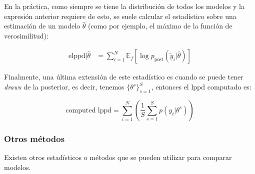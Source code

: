 En la práctica, como siempre se tiene la distribución de todos los modelos y la expresión anterior requiere de esto, se suele calcular el estadístico sobre una estimación de un modelo $\hat{\theta}$ (como por ejemplo, el máximo de la función de verosimilitud):

\begin{align}
\text{elppd}|\hat{\theta} & = \sum_{i=1}^N \mathbb{E}_f[\log p_{\text{post}}(\tilde{y}_i|\hat{\theta})]
\end{align}

Finalmente, una última extensión de este estadístico es cuando se puede tener \emph{draws} de la posterior, es decir, tenemos $\{ \theta^s\}_{s=1}^S$, entonces el lppd computado es:

\begin{equation}
\text{computed lppd} = \sum_{i=1}^N \left( \frac{1}{S} \sum_{s=1}^S p(y_i|\theta^s)\right)
\end{equation}

\subsubsection{Otros métodos}
Existen otros estadísticos o métodos que se pueden utilizar para comparar modelos. 

